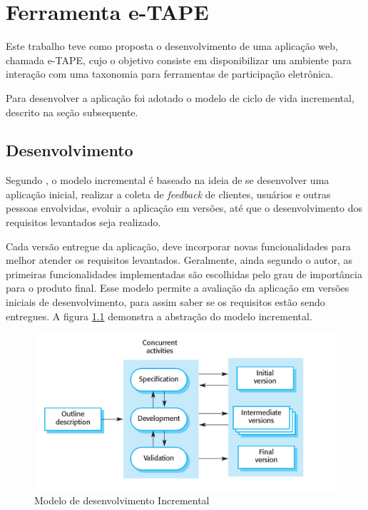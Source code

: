 \chapter[Ferramenta]{Ferramenta e-TAPE}
\label{cap:cap3}
Este trabalho teve como proposta o desenvolvimento de uma aplicação web, chamada e-TAPE, cujo o objetivo consiste em
disponibilizar um ambiente para interação com uma taxonomia para ferramentas de participação eletrônica.

\par
Para desenvolver a aplicação foi adotado o modelo de ciclo de vida incremental, descrito na seção subsequente.

\section {Desenvolvimento}
\label{sec:desenvolvimento}
\par
Segundo , o modelo incremental é baseado na ideia de se desenvolver uma aplicação inicial,
realizar a coleta de \textit{feedback} de clientes, usuários e outras pessoas envolvidas, evoluir a aplicação em versões, até que o desenvolvimento dos requisitos levantados seja realizado.

\par
Cada versão entregue da aplicação, deve incorporar novas funcionalidades para melhor atender os requisitos levantados. Geralmente, ainda segundo o autor, as primeiras funcionalidades
implementadas são escolhidas pelo grau de importância para o produto final. Esse modelo permite a avaliação da aplicação em versões iniciais de desenvolvimento, para assim saber 
se os requisitos estão sendo entregues. A figura \ref{fig:modelo-incremental} demonstra a abstração do modelo incremental.


\begin{figure}[!ht]
    \centering
    \includegraphics[scale=0.20]{./figuras/modelo_incremental.png}
    \caption{Modelo de desenvolvimento Incremental }
    \label{fig:modelo-incremental}
\end{figure}

